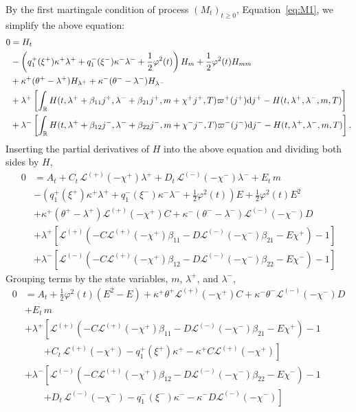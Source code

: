 \documentclass[11pt,a4paper]{article}
\numberwithin{equation}{section}
\theoremstyle{remark}
\theoremstyle{definition}
\newcommand{\dd}{{\rm d}}
\begin{document}
By the first martingale condition of process $(M_t)_{t\geq 0}$, Equation~\eqref{eq:M1}, we simplify the above equation:
\begin{align*}
    0 &= H_t \\
    &-\left(q^+_1(\xi^+)\kappa^+\lambda^++q^-_1(\xi^-)\kappa^-\lambda^-+\frac{1}{2}\varphi^2(t)\right)H_m
    +\frac{1}{2}\varphi^2(t)H_{mm}\\
    &+\kappa^+(\theta^+-\lambda^+)H_{\lambda^+}
    +\kappa^-(\theta^--\lambda^-)H_{\lambda^-}\\
    &+\lambda^+ \left[\int_\mathbb{R}H(t, \lambda^++\beta_{11}j^+, \lambda^-+\beta_{21}j^+, m+\chi^+j^+, T)\varpi^+(j^+)\dd j^+-H(t, \lambda^+, \lambda^-, m, T)\right]\\
    &+\lambda^- \left[\int_\mathbb{R}H(t, \lambda^++\beta_{12}j^-, \lambda^-+\beta_{22}j^-, m+\chi^-j^-, T)\varpi^-(j^-)\dd j^--H(t, \lambda^+, \lambda^-, m, T)\right].
\end{align*}
Inserting the partial derivatives of $H$ into the above equation and dividing both sides by $H$,
\begin{align*}
    0 &= A_t + C_t \,\mathcal{L}^{(+)}(-\chi^+)\lambda^+ + D_t\, \mathcal{L}^{(-)}(-\chi^-) \lambda^-  + E_t\, m\\
    &-\left(q^+_1(\xi^+)\kappa^+\lambda^++q^-_1(\xi^-)\kappa^-\lambda^-+\frac{1}{2}\varphi^2(t)\right)E
    +\frac{1}{2}\varphi^2(t)E^2\\
    &+\kappa^+(\theta^+-\lambda^+)\mathcal{L}^{(+)}(-\chi^+)C
    +\kappa^-(\theta^--\lambda^-)\mathcal{L}^{(-)}(-\chi^-)D\\
    &+\lambda^+\left[\mathcal{L}^{(+)}(-C\mathcal{L}^{(+)}(-\chi^+)\beta_{11}-D\mathcal{L}^{(-)}(-\chi^-)\beta_{21}-E\chi^+)-1\right]\\
    &+\lambda^-\left[\mathcal{L}^{(-)}(-C\mathcal{L}^{(+)}(-\chi^+)\beta_{12}-D\mathcal{L}^{(-)}(-\chi^-)\beta_{22}-E\chi^-)-1\right]
\end{align*}
Grouping terms by the state variables, $m$, $\lambda^+$, and $\lambda^-$,
\begin{align*}
    0 &= A_t + \frac{1}{2}\varphi^2(t)(E^2-E) +\kappa^+\theta^+\mathcal{L}^{(+)}(-\chi^+)C + \kappa^-\theta^-\mathcal{L}^{(-)}(-\chi^-)D\\
    &+ E_t\, m\\
    &+\lambda^+\left[\mathcal{L}^{(+)}(-C\mathcal{L}^{(+)}(-\chi^+)\beta_{11}-D\mathcal{L}^{(-)}(-\chi^-)\beta_{21}-E\chi^+)-1\right.\\
    &\qquad\left. + C_t\,  \mathcal{L}^{(+)}(-\chi^+)-q^+_1(\xi^+)\kappa^+-\kappa^+C\mathcal{L}^{(+)}(-\chi^+)\right]\\
    &+\lambda^-\left[\mathcal{L}^{(-)}(-C\mathcal{L}^{(+)}(-\chi^+)\beta_{12}-D\mathcal{L}^{(-)}(-\chi^-)\beta_{22}-E\chi^-)-1\right.\\
    &\qquad\left. + D_t\, \mathcal{L}^{(-)}(-\chi^-)-q^-_1(\xi^-)\kappa^--\kappa^-D\mathcal{L}^{(-)}(-\chi^-)\right]
 \end{align*}
\end{document}
